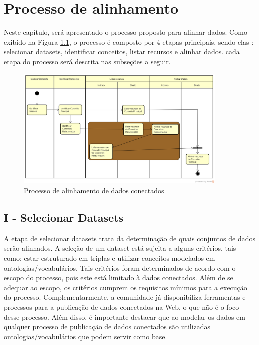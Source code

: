 \chapter{Processo de alinhamento}

Neste capítulo, será apresentado o processo proposto para alinhar dados. Como exibido na Figura \ref{fig:processo}, o processo é composto por 4 etapas principais, sendo elas : selecionar datasets, identificar conceitos, listar recursos e alinhar dados. cada etapa do processo será descrita nas subseções a seguir.


\begin{figure}[!ht]
	\centering
	\includegraphics[width=0.9\textwidth]{./imagens/processo.png}
    \caption{Processo de alinhamento de dados conectados}
	\label{fig:processo}
\end{figure}

\section{I - Selecionar Datasets}
A etapa de selecionar datasets trata da determinação de quais conjuntos de dados serão alinhados. A seleção de um dataset está sujeita a alguns critérios, tais como: estar estruturado em triplas e utilizar conceitos modelados em ontologias/vocabulários. Tais critérios foram determinados de acordo com o escopo do processo, pois este está limitado à dados conectados. Além de se adequar ao escopo, os critérios cumprem os requisitos mínimos para a execução do processo.
Complementarmente, a comunidade já disponibiliza ferramentas e processos para a publicação de dados conectados na Web, o que não é o foco desse processo. Além disso, é importante destacar que ao modelar os dados em qualquer processo de publicação de dados conectados são utilizadas ontologias/vocabulários que podem servir como base.

